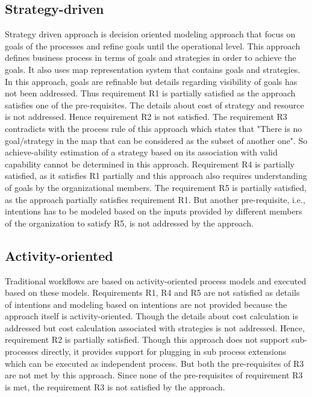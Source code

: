 \subsection{Strategy-driven} 
Strategy driven approach is decision oriented modeling approach that focus on goals of the processes and refine goals until the operational level. This approach defines business process in terms of goals and strategies in order to achieve the goals. It also uses map representation system that contains goals and strategies. In this approach, goals are refinable but details regarding visibility of goals has not been addressed. Thus requirement R1 is partially satisfied as the approach satisfies one of the pre-requisites. The details about cost of strategy and resource is not addressed. Hence requirement R2 is not satisfied. The requirement R3 contradicts with the process rule of this approach which states that "There is no goal/strategy in the map that can be considered as the subset of another one". So achieve-ability estimation of a strategy based on its association with valid capability cannot be determined in this approach. Requirement R4 is partially satisfied, as it satisfies R1 partially and this approach also requires understanding of goals by the organizational members. The requirement R5 is partially satisfied, as the approach partially satisfies requirement R1. But another pre-requisite, i.e., intentions has to be modeled based on the inputs provided by different members of the organization to satisfy R5, is not addressed by the approach. 

\subsection{Activity-oriented} 
Traditional workflows are based on activity-oriented process models and executed based on these models. Requirements R1, R4 and R5 are not satisfied as details of intentions and modeling based on intentions are not provided because the approach itself is activity-oriented. Though the details about cost calculation is addressed but cost calculation associated with strategies is not addressed. Hence, requirement R2 is partially satisfied. Though this approach does not support sub-processes directly, it provides support for plugging in sub process extensions which can be executed as independent process. But both the pre-requisites of R3 are not met by this approach. Since none of the pre-requisites of requirement R3 is met, the requirement R3 is not satisfied by the approach. 

